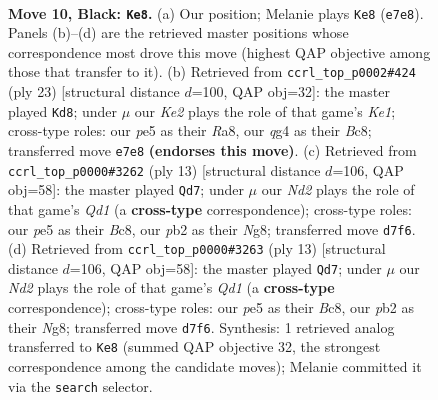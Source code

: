 \documentclass[11pt]{article}
\begin{document}
\clearpage

\begin{figure}[p]\centering
\begin{subfigure}{0.46\textwidth}\centering
\resizebox{\linewidth}{!}{%
\newchessgame
\chessboard[
  setfen={r1b2b1r/pp1nkppp/2n1p3/q2pP3/3P2Q1/3B1PP1/PP1N3P/R1B1K1NR b KQ - 0 10},
  showmover=false,
  pgfstyle=straightmove, color=movearrow, markmove={e7-e8}
]}
\caption{}
\end{subfigure}\hfill
\begin{subfigure}{0.46\textwidth}\centering
\resizebox{\linewidth}{!}{%
\newchessgame
\chessboard[
  setfen={r1b1kb1r/pp1p1ppp/n1pP4/2q4n/2P1QB2/2N1PPP1/P6P/2R1KBNR b Kkq - 0 12},
  showmover=false,
  pgfstyle=straightmove, color=movearrow, markmove={e8-d8}
]}
\caption{}
\end{subfigure}
\\[4pt]
\begin{subfigure}{0.46\textwidth}\centering
\resizebox{\linewidth}{!}{%
\newchessgame
\chessboard[
  setfen={r1bqk1nr/ppp2ppp/2np4/b3p3/2BPP3/1QP2N2/P4PPP/RNB1K2R b KQkq - 1 7},
  showmover=false,
  pgfstyle=straightmove, color=movearrow, markmove={d8-d7}
]}
\caption{}
\end{subfigure}\hfill
\begin{subfigure}{0.46\textwidth}\centering
\resizebox{\linewidth}{!}{%
\newchessgame
\chessboard[
  setfen={r1bqk1nr/ppp2ppp/2np4/b3p3/2BPP3/1QP2N2/P4PPP/RNB1K2R b KQkq - 1 7},
  showmover=false,
  pgfstyle=straightmove, color=movearrow, markmove={d8-d7}
]}
\caption{}
\end{subfigure}
\caption{\textbf{Move 10, Black: \texttt{Ke8}.} (a) Our position; Melanie plays \texttt{Ke8} (\texttt{e7e8}). Panels (b)--(d) are the retrieved master positions whose correspondence most drove this move (highest QAP objective among those that transfer to it). (b) Retrieved from \texttt{ccrl\_top\_p0002\#424} (ply 23) [structural distance $d$=100, QAP obj=32]: the master played \texttt{Kd8}; under $\mu$ our \emph{Ke2} plays the role of that game's \emph{Ke1}; cross-type roles: our \emph{p}e5 as their \emph{R}a8, our \emph{q}g4 as their \emph{B}c8; transferred move \texttt{e7e8} \textbf{(endorses this move)}. (c) Retrieved from \texttt{ccrl\_top\_p0000\#3262} (ply 13) [structural distance $d$=106, QAP obj=58]: the master played \texttt{Qd7}; under $\mu$ our \emph{Nd2} plays the role of that game's \emph{Qd1} (a \textbf{cross-type} correspondence); cross-type roles: our \emph{p}e5 as their \emph{B}c8, our \emph{p}b2 as their \emph{N}g8; transferred move \texttt{d7f6}. (d) Retrieved from \texttt{ccrl\_top\_p0000\#3263} (ply 13) [structural distance $d$=106, QAP obj=58]: the master played \texttt{Qd7}; under $\mu$ our \emph{Nd2} plays the role of that game's \emph{Qd1} (a \textbf{cross-type} correspondence); cross-type roles: our \emph{p}e5 as their \emph{B}c8, our \emph{p}b2 as their \emph{N}g8; transferred move \texttt{d7f6}. Synthesis: 1 retrieved analog transferred to \texttt{Ke8} (summed QAP objective 32, the strongest correspondence among the candidate moves); Melanie committed it via the \texttt{search} selector.}
\label{fig:thought-m19}
\end{figure}
\end{document}
